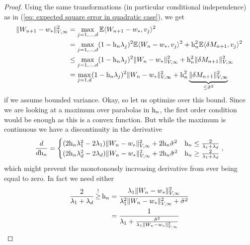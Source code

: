 \begin{proof}
	Using the same
	transformations (in particular conditional independence) as in (\ref{eq:
	expected square error in quadratic case}), we get
	\begin{align}
		\nonumber
		\|W_{n+1} -w_*\|_{V,\infty}^2
		&= \max_{j=1,\dots,d} \mathbb{E}\langle W_{n+1} -w_*, v_j\rangle^2\\
		\nonumber
		&= \max_{j=1,\dots,d} (1-\text{h}_n\lambda_j)^2\mathbb{E}\langle W_n -w_*, v_j\rangle^2
		+ \text{h}_n^2 \mathbb{E}\langle \delta M_{n+1}, v_j \rangle^2\\
		\nonumber
		&\le \max_{j=1,\dots,d} (1-\text{h}_n\lambda_j)^2\|W_n -w_*\|_{V,\infty}^2
		+ \text{h}_n^2 \|\delta M_{n+1}\|_{V,\infty}^2\\
		\label{eq: upper bound weird norm weight distance}
		&= \max_{j=1,d} (1-\text{h}_n\lambda_j)^2\|W_n -w_*\|_{V,\infty}^2
		+ \text{h}_n^2 \underbrace{\|\delta M_{n+1}\|_{V,\infty}^2}_{\le \tilde{\sigma}^2}
	\end{align}
	if we assume bounded variance. Okay, so let us optimize over this bound. Since
	we are looking at a maximum over parabolas in \(\text{h}_n\), the first order
	condition would be enough as this is a convex function. But while the maximum is
	continuous we have a discontinuity in the derivative 
	\begin{align*}
		\frac{d}{d\text{h}_n}
		= \begin{cases}
		(2\text{h}_n \lambda_1^2 - 2\lambda_1)\|W_n-w_*\|_{V,\infty}^2
		+ 2 \text{h}_n \tilde{\sigma}^2
		& \text{h}_n \le \frac{2}{\lambda_1+\lambda_d}\\
		(2\text{h}_n \lambda_d^2 - 2\lambda_d)\|W_n-w_*\|_{V,\infty}^2
		+ 2 \text{h}_n \tilde{\sigma}^2
		& \text{h}_n \ge \frac{2}{\lambda_1+\lambda_d}
		\end{cases},
	\end{align*}
	which might prevent the monotonously increasing derivative from ever being equal
	to zero. In fact we need either
	\begin{align*}
		\frac{2}{\hesseEV_1+\hesseEV_\dimension} \xge{!} \lr_n
		&= \frac{
			\hesseEV_1 \|\Weights_n-\minimum\|_{V,\infty}^2
		}{
			\hesseEV_1^2 \|\Weights_n-\minimum\|_{V,\infty}^2 + \tilde{\stdBound}^2
		}\\
		&= \frac{1}{
			\hesseEV_1 + \frac{\tilde{\stdBound}^2}{
				\hesseEV_1\|\Weights_n-\minimum\|_{V,\infty}^2
			}
		}
	\end{align*}

\end{proof}
